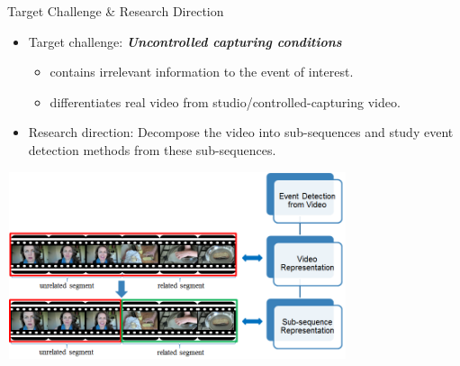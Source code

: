 \documentclass{beamer}
\begin{document}
\begin{frame}[t]{Target Challenge \& Research Direction}
	\begin{itemize}
		\item Target challenge: \textit{\textbf{Uncontrolled capturing conditions}} 
			\begin{itemize}
				
\item contains irrelevant information to the event of interest.
\item differentiates real video from studio/controlled-capturing video.
		 	\end{itemize}
		\item Research direction: Decompose the video into sub-sequences and study event detection methods from these sub-sequences.
	\end{itemize}
	\begin{center}
		\includegraphics[width=10cm,height=5.5cm]{images/part1/mainchallenge.png}
		\\
		\footnotesize{}
	\end{center}
	
\end{frame}
\end{document}
